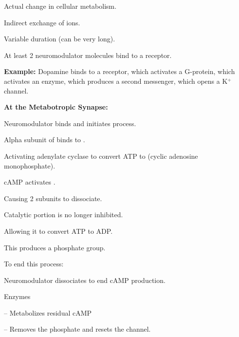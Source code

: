 \begin{coloredlist}
    \item Actual change in cellular metabolism.
    \item Indirect exchange of ions.
    \item Variable duration (can be very long).
    \item At least 2 neuromodulator molecules bind to a receptor.
    \item \textbf{Example:} Dopamine binds to a receptor, which activates a G-protein, which activates an enzyme, which produces a second messenger, which opens a K\(^+\) channel.
    \item \textbf{At the Metabotropic Synapse:}
    \begin{coloredlist}
        \item Neuromodulator binds and initiates process.
        \item Alpha subunit of  binds to .
        \begin{coloredlist}
            \item Activating adenylate cyclase to convert ATP to  (cyclic adenosine monophosphate).
        \end{coloredlist}
        \item cAMP activates .
        \begin{coloredlist}
            \item Causing 2 subunits to dissociate.
            \item Catalytic portion is no longer inhibited.
            \item Allowing it to convert ATP to ADP. 
            \begin{coloredlist}
                \item This produces a phosphate group.
            \end{coloredlist}
        \item To end this process:
        \begin{coloredlist}
            \item Neuromodulator dissociates to end cAMP production.
            \item Enzymes
            \begin{coloredlist}
                \item {} -- Metabolizes residual cAMP
                \item {} -- Removes the phosphate and resets the channel.
            \end{coloredlist}
        \end{coloredlist}
        \end{coloredlist}
    \end{coloredlist}
\end{coloredlist}

